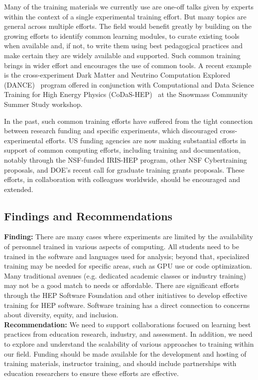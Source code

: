 Many of the training materials we currently use are one-off talks given by experts within the context of a single experimental training effort.  But many topics are general across multiple efforts.  The field would benefit greatly by building on the growing efforts to identify common learning modules,  to curate existing tools when available and, if not, to write them using best pedagogical practices and make certain they are widely available and supported.    Such common training brings in wider effort and encourages the use of common tools.  A recent example is the cross-experiment Dark Matter and Neutrino Computation Explored (DANCE)~\cite{Roberts:2022ezy} program offered in conjunction  with Computational and Data Science Training for High Energy Physics (CoDaS-HEP)~\cite{CODAS-HEP} at  the Snowmass Community Summer Study workshop.

In the past, such common training efforts have suffered from the  tight connection between research funding and specific experiments, which discouraged cross-experimental efforts. US funding agencies are now making substantial efforts in support of common computing efforts, including training and documentation, notably through the NSF-funded IRIS-HEP program, other NSF Cybertraining proposals, and DOE's recent call for graduate training grants proposals. These efforts, in collaboration with colleagues worldwide, should be encouraged and extended.



\subsection{Findings and Recommendations}
\textbf{Finding:} There are many cases where experiments are limited by the availability of personnel trained in various aspects of computing. All students need to be trained in the software and languages used for analysis; beyond that, specialized training may be needed for specific areas, such as GPU use or code optimization. Many traditional avenues (e.g. dedicated academic classes or industry training) may not be a good match to needs or affordable. There are significant efforts through the HEP Software Foundation and other initiatives to develop effective training for HEP software. Software training has a direct connection to concerns about diversity, equity, and inclusion.\\
\textbf{Recommendation:}  We need to support collaborations focused on learning best practices from education research, industry, and assessment. In addition, we need to explore and understand the scalability of various approaches to training within our field.  Funding should be made available for the development and hosting of training materials, instructor training, and should include partnerships with education researchers to ensure these efforts are effective.

